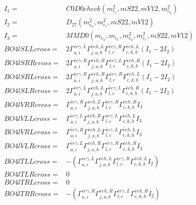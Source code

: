 \documentclass[A4,landscape]{article}
\begin{document}
\begin{align} 
I_1 = & C0D0check(m^2_{e_{{c}}}, mS22, mV12, m^2_{e_{{a}}}) \\ 
I_2 = & D_{27}(m^2_{e_{{a}}}, m^2_{e_{{c}}}, mS22, mV12) \\ 
I_3 = & MMD0(m_{e_{{a}}}, m_{e_{{c}}}, m^2_{e_{{a}}}, m^2_{e_{{c}}}, mS22, mV12) \\ 
  BO4lSLLcross= & 2  \Gamma^{\bar{e}e \gamma ,L}_{a, i} \Gamma^{\bar{e}e h ,L}_{j, a, b} \Gamma^{\bar{e}e \gamma ,R}_{l, c} \Gamma^{\bar{e}e h ,L}_{c, k, b} (I_1 - 2 I_2) \\ 
  BO4lSRRcross= & 2  \Gamma^{\bar{e}e \gamma ,R}_{a, i} \Gamma^{\bar{e}e h ,R}_{j, a, b} \Gamma^{\bar{e}e \gamma ,L}_{l, c} \Gamma^{\bar{e}e h ,R}_{c, k, b} (I_1 - 2 I_2) \\ 
  BO4lSRLcross= & 2  \Gamma^{\bar{e}e \gamma ,R}_{a, i} \Gamma^{\bar{e}e h ,R}_{j, a, b} \Gamma^{\bar{e}e \gamma ,R}_{l, c} \Gamma^{\bar{e}e h ,L}_{c, k, b} (I_1 - 2 I_2) \\ 
  BO4lSLRcross= & 2  \Gamma^{\bar{e}e \gamma ,L}_{a, i} \Gamma^{\bar{e}e h ,L}_{j, a, b} \Gamma^{\bar{e}e \gamma ,L}_{l, c} \Gamma^{\bar{e}e h ,R}_{c, k, b} (I_1 - 2 I_2) \\ 
  BO4lVRRcross= &  \Gamma^{\bar{e}e \gamma ,R}_{a, i} \Gamma^{\bar{e}e h ,L}_{j, a, b} \Gamma^{\bar{e}e \gamma ,R}_{l, c} \Gamma^{\bar{e}e h ,R}_{c, k, b} I_3 \\ 
  BO4lVLLcross= &  \Gamma^{\bar{e}e \gamma ,L}_{a, i} \Gamma^{\bar{e}e h ,R}_{j, a, b} \Gamma^{\bar{e}e \gamma ,L}_{l, c} \Gamma^{\bar{e}e h ,L}_{c, k, b} I_3 \\ 
  BO4lVRLcross= &  \Gamma^{\bar{e}e \gamma ,R}_{a, i} \Gamma^{\bar{e}e h ,L}_{j, a, b} \Gamma^{\bar{e}e \gamma ,L}_{l, c} \Gamma^{\bar{e}e h ,L}_{c, k, b} I_3 \\ 
  BO4lVLRcross= &  \Gamma^{\bar{e}e \gamma ,L}_{a, i} \Gamma^{\bar{e}e h ,R}_{j, a, b} \Gamma^{\bar{e}e \gamma ,R}_{l, c} \Gamma^{\bar{e}e h ,R}_{c, k, b} I_3 \\ 
  BO4lTLLcross= & -( \Gamma^{\bar{e}e \gamma ,L}_{a, i} \Gamma^{\bar{e}e h ,L}_{j, a, b} \Gamma^{\bar{e}e \gamma ,R}_{l, c} \Gamma^{\bar{e}e h ,L}_{c, k, b} I_2) \\ 
  BO4lTLRcross= & 0 \\ 
  BO4lTRLcross= & 0 \\ 
  BO4lTRRcross= & -( \Gamma^{\bar{e}e \gamma ,R}_{a, i} \Gamma^{\bar{e}e h ,R}_{j, a, b} \Gamma^{\bar{e}e \gamma ,L}_{l, c} \Gamma^{\bar{e}e h ,R}_{c, k, b} I_2) \\ 
\end{align} 
\end{document}
